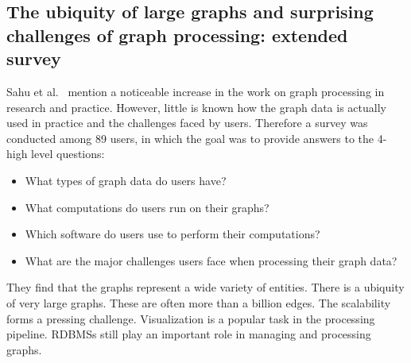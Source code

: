 \subsection{The ubiquity of large graphs and surprising challenges of graph
processing: extended survey}
Sahu et al.~\cite{DBLP:journals/vldb/SahuMSLO20} mention a noticeable increase in the work on graph processing in research and practice. However, little is known how the graph data is actually used in practice and the challenges faced by users. Therefore a survey was conducted among 89 users, in which the goal was to provide answers to the 4-high level questions: 
\begin{itemize}
    \item What types of graph data do users have?
    \item What computations do users run on their graphs? 
    \item Which software do users use to perform their computations? 
    \item What are the major challenges users face when processing their graph data?
\end{itemize}

They find that the graphs represent a wide variety of entities. There is a ubiquity of very large graphs. These are often more than a billion edges. The scalability forms a pressing challenge. Visualization is a popular task in the processing pipeline. RDBMSs still play an important role in managing and processing graphs. 